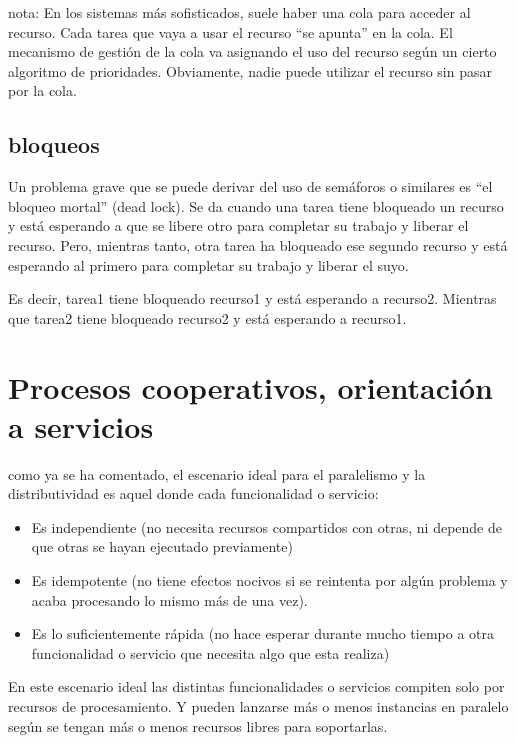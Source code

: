 \documentclass[spanish,12pt,a4paper,final,oneside]{book}
\begin{document}
nota: En los sistemas más sofisticados, suele haber una cola para acceder al recurso. Cada tarea que vaya a usar el recurso ``se apunta'' en la cola. El mecanismo de gestión de la cola va asignando el uso del recurso según un cierto algoritmo de prioridades. Obviamente, nadie puede utilizar el recurso sin pasar por la cola.

\subsection{bloqueos}
Un problema grave que se puede derivar del uso de semáforos o similares es ``el bloqueo mortal'' (dead lock). Se da cuando una tarea tiene bloqueado un recurso y está esperando a que se libere otro para completar su trabajo y liberar el recurso. Pero, mientras tanto, otra tarea ha bloqueado ese segundo recurso y está esperando al primero para completar su trabajo y liberar el suyo.

Es decir, tarea1 tiene bloqueado recurso1 y está esperando a recurso2. Mientras que tarea2 tiene bloqueado recurso2 y está esperando a recurso1.



\section{Procesos cooperativos, orientación a servicios}

como ya se ha comentado, el escenario ideal para el paralelismo y la distributividad es aquel donde cada funcionalidad o servicio:

\begin{itemize}

\item Es independiente (no necesita recursos compartidos con otras, ni depende de que otras se hayan ejecutado previamente) 

\item Es idempotente (no tiene efectos nocivos si se reintenta por algún problema y acaba procesando lo mismo más de una vez).

\item Es lo suficientemente rápida (no hace esperar durante mucho tiempo a otra funcionalidad o servicio que necesita algo que esta realiza)


\end{itemize}

En este escenario ideal las distintas funcionalidades o servicios compiten solo por recursos de procesamiento. Y pueden lanzarse más o menos instancias en paralelo según se tengan más o menos recursos libres para soportarlas.
\end{document}
